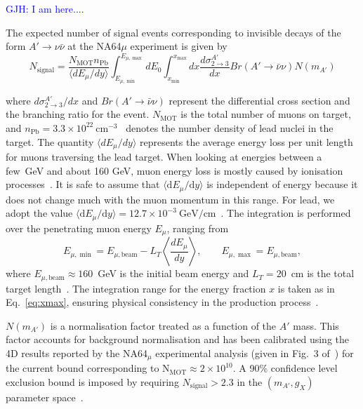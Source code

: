 \documentclass[onecolumn, aps, nofootinbib, prd, preprint, floats, floatfix, amsmath, amssymb, superscriptaddress, preprintnumbers]{revtex4-1}
\newcommand{\GJH}[1]{\textcolor{blue} {GJH: #1}}
\begin{document}
\GJH{I am here....}


The expected number of signal events corresponding to invisible decays of the form $A' \to \nu\bar{\nu}$ at the NA64$\mu$  experiment is given by
\begin{equation}
N_{\text{signal}} = \frac{N_{\text{MOT}} n_{\text{Pb}}}{\langle dE_\mu/dy \rangle} \int_{E_{\mu,\min}}^{E_{\mu,\max}} dE_0 \int_{x_{\min}}^{x_{\max}} dx \frac{d\sigma_{2\to3}^{A'}}{dx} Br(A' \to \bar{\nu}\nu) N(m_{A'})
\label{eq:NA64Signal}
\end{equation}

where $d\sigma_{2\to3}^{A'}/dx$ and $Br(A'\to\bar{\nu}\nu)$ represent the differential cross section and the branching ratio for the event. $N_{\text{MOT}}$ is the total number of muons on target, and $n_{\text{Pb}} = 3.3 \times 10^{22}~\text{cm}^{-3}$~\cite{navas2024review} denotes the number density of lead nuclei in the target. The quantity $\langle dE_\mu/dy\rangle$ represents the average energy loss per unit length for muons traversing the lead target. When looking at energies between a few~GeV and about 160 GeV, muon energy loss is mostly caused by ionisation processes~\cite{andreev2024shedding}. It is safe to assume that $\langle\mathrm{d}E_\mu/\mathrm{d}y\rangle$ is independent of energy because it does not change much with the muon momentum in this range. For lead, we adopt the value $\langle\mathrm{d}E_\mu/\mathrm{d}y\rangle = 12.7 \times 10^{-3}~\mathrm{GeV}/\mathrm{cm}$~\cite{navas2024review}. The integration is performed over the penetrating muon energy $E_\mu$, ranging from
\begin{equation}
E_{\mu,\min} = E_{\mu,\text{beam}} - L_T \left\langle \frac{dE_\mu}{dy} \right\rangle, \qquad E_{\mu,\max} = E_{\mu,\text{beam}},
\label{eq:NA64Emu}
\end{equation}
where $E_{\mu,\text{beam}} \approx 160$~GeV is the initial beam energy and $L_T = 20$~cm is the total target length~\cite{chen2018exploring}. The integration range for the energy fraction $x$ is taken as in Eq.~\cref{eq:xmax}, ensuring physical consistency in the production process~\cite{kirpichnikov2021probing}.

$N(m_{A'})$ is a normalisation factor treated as a function of the $A'$ mass. This factor accounts for background normalisation and has been calibrated using the 4D results reported by the NA64$_\mu$ experimental analysis (given in Fig.~3 of~\cite{andreev2024exploration}) for the current bound corresponding to $\mathrm{N_{MOT}} \approx 2 \times 10^{10}$. A 90\% confidence level exclusion bound is imposed by requiring $N_{\text{signal}} > 2.3$ in the $(m_{A'}, g_X)$ parameter space~\cite{andreev2024shedding,lista2023statistical}.
\end{document}

